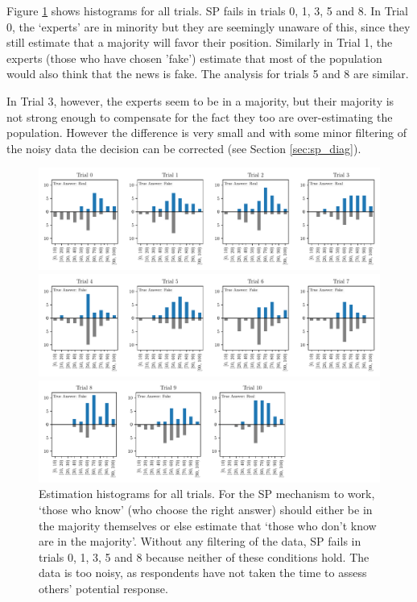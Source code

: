 \documentclass{report}
\theoremstyle{definition}
\begin{document}
Figure \ref{fig:exp1_estim_all} shows histograms for all trials. SP fails in trials 0, 1, 3, 5 and 8. In Trial 0, the `experts' are in minority but they are seemingly unaware of this, since they still estimate that a majority will favor their position. Similarly in Trial 1, the experts (those who have chosen 'fake') estimate that most of the population would also think that the news is fake. The analysis for trials 5 and 8 are similar. 

In Trial 3, however, the experts seem to be in a majority, but their majority is not strong enough to compensate for the fact they too are over-estimating the population. However the difference is very small and with some minor filtering of the noisy data the decision can be corrected (see Section \ref{sec:sp_diag}).

\begin{center}
\begin{figure}
\hspace*{-3cm}
\begin{minipage}{1.5\linewidth}
    \centering
    \centerline{\includegraphics[width=\textwidth]{exp1_estim_0-3.pdf}}
    \centerline{\includegraphics[width=\textwidth]{exp1_estim_4-7.pdf}}
    \centerline{\includegraphics[width=\textwidth]{exp1_estim_8-10.pdf}}
    \caption{Estimation histograms for all trials. For the SP mechanism to work, `those who know' (who choose the right answer) should either be in the majority themselves or else estimate that `those who don't know are in the majority'. Without any filtering of the data, SP fails in trials 0, 1, 3, 5 and 8 because neither of these conditions hold. The data is too noisy, as respondents have not taken the time to assess others' potential response.}
    \label{fig:exp1_estim_all}
\end{minipage}
\end{figure}
\end{center}
\end{document}
